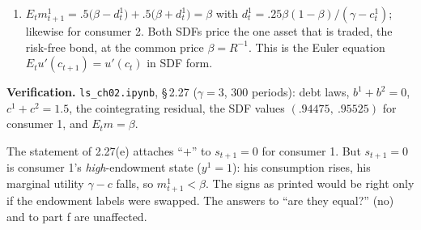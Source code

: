 \documentclass[12pt, letterpaper]{article}
\newcommand{\nb}[1]{\texttt{ls\_ch02.ipynb}, \S\,#1}
\begin{document}
\begin{tcolorbox}[oddbox,title={Exercise 2.27 \quad Permanent Income Model Again}]
\begin{enumerate}
\[m^2_{t+1}=\begin{cases}\beta+.25\frac{\beta(1-\beta)}{\gamma-c^2_t},&s_{t+1}=0\\[3pt]
\beta-.25\frac{\beta(1-\beta)}{\gamma-c^2_t},&s_{t+1}=1\end{cases}
\]
These have the \textbf{opposite signs} to the printed statement (see the trap box). They are
\textbf{not equal}: in each state one consumer's SDF lies above $\beta$ and the other's below. With only
a risk-free bond, markets are incomplete, and the consumers cannot trade state-contingent claims that
would equate their marginal rates of substitution state by state.
\item $E_tm^1_{t+1}=.5\big(\beta-d^1_t\big)+.5\big(\beta+d^1_t\big)=\beta$ with
$d^1_t=.25\beta(1-\beta)/(\gamma-c^1_t)$; likewise for consumer 2. Both SDFs price the one asset that is
traded, the risk-free bond, at the common price $\beta=R^{-1}$. This is the Euler equation
$E_tu'(c_{t+1})=u'(c_t)$ in SDF form.
\end{enumerate}

\textbf{Verification.} \nb{2.27} ($\gamma=3$, 300 periods): debt laws, $b^1+b^2=0$, $c^1+c^2=1.5$, the
cointegrating residual, the SDF values $(.94475,\ .95525)$ for consumer 1, and $E_tm=\beta$. \checkmark
\end{tcolorbox}

\begin{tcolorbox}[trapbox]
The statement of 2.27(e) attaches ``$+$'' to $s_{t+1}=0$ for consumer 1. But $s_{t+1}=0$ is consumer
1's \emph{high}-endowment state ($y^1=1$): his consumption rises, his marginal utility $\gamma-c$ falls,
so $m^1_{t+1}<\beta$. The signs as printed would be right only if the endowment labels were swapped. The
answers to ``are they equal?'' (no) and to part f are unaffected.
\end{tcolorbox}
\end{document}
